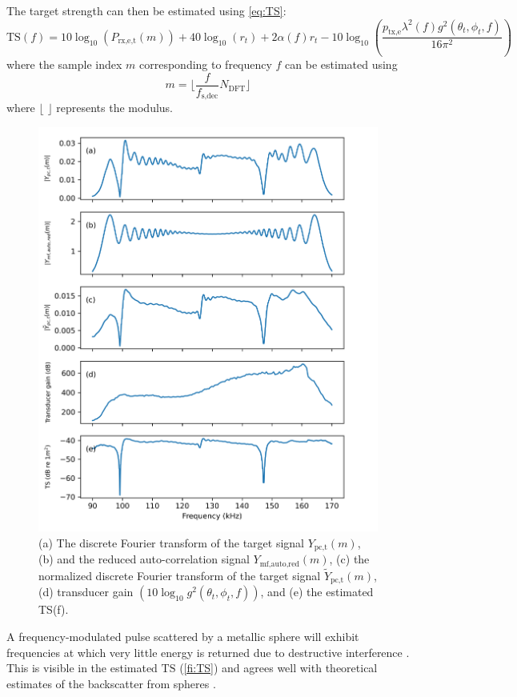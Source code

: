\documentclass[preprint,12pt,TurnOnLineNumbers]{JASAnew}
\newcommand{\freqsym}{f}
\newcommand{\samplesymf}{m}
\newcommand{\fsdec}{f_{\textrm{s,dec}}}
\newcommand{\ptxe}{p_{\textrm{tx,e}}}
\newcommand{\ypctargetf}{Y_{\textrm{pc,t}}}
\newcommand{\ypctargetnormf}{\tilde{Y}_{\textrm{pc,t}}}
\newcommand{\ymfautoredf}{Y_{\textrm{mf,auto,red}}}
\newcommand{\prxetf}{P_{\textrm{rx,e,t}}}
\newcommand{\ts}{\textrm{TS}}
\newcommand{\range}{r}
\newcommand{\athw}{\phi}
\newcommand{\along}{\theta}
\newcommand{\gain}{g}
\newcommand{\wlen}{\lambda}
\newcommand{\absorp}{\alpha}
\newcommand{\ndft}{{N_{\textrm{DFT}}}}
\begin{document}
The target strength can then be estimated using \autoref{eq:TS}:
\begin{equation}
\label{eq:TS_f}
\ts(\freqsym) = 10\log_{10}(\prxetf(\samplesymf)) + 40\log_{10}(\range_t) + 2\absorp(\freqsym)\range_t - 10\log_{10}\left( \frac{\ptxe \wlen^2(\freqsym) \gain^2(\along_t,\athw_t,f)}{16\pi^2} \right)
\end{equation}
where the sample index $\samplesymf$ corresponding to frequency $\freqsym$ can be estimated using
\begin{equation}
\label{eq:m(f)}
\samplesymf = \lfloor \frac{\freqsym}{\fsdec} \ndft \rfloor 
\end{equation}
where $\lfloor$ $\rfloor$ represents the modulus.
%
\begin{figure}
\includegraphics[width=16cm]{Fig_TS}
\caption{\label{fi:TS} (a) The discrete Fourier transform of the target signal $\ypctargetf(\samplesymf)$, (b) and the reduced auto-correlation signal $\ymfautoredf(\samplesymf)$, (c) the normalized discrete Fourier transform of the target signal $\ypctargetnormf(\samplesymf)$, (d) transducer gain $(10\log_{10}\gain^2(\along_t,\athw_t,\freqsym))$, and (e) the estimated TS(f).}
\end{figure}
%
A frequency-modulated pulse scattered by a metallic sphere will exhibit frequencies at which very little energy is returned due to destructive interference \citep{stanton2008}. This is visible in the estimated $\ts$ (\autoref{fi:TS}) and agrees well with theoretical estimates of the backscatter from spheres \citep{maclennan1981}.
\end{document}
